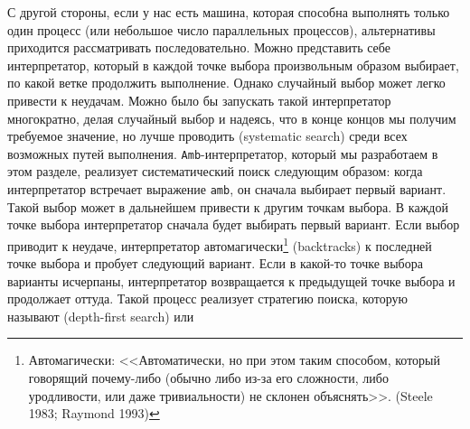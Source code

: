 С другой 
стороны, если у нас есть машина, которая способна
выполнять только один процесс (или небольшое число параллельных процессов),
альтернативы приходится рассматривать последовательно.  Можно
представить себе интерпретатор, который в каждой точке выбора
произвольным образом выбирает, по какой ветке продолжить выполнение.
Однако случайный выбор может легко привести к неудачам.
Можно было бы запускать такой интерпретатор многократно, делая
случайный выбор и надеясь, что в конце концов мы получим требуемое
значение, но лучше проводить 
 (systematic search)
среди всех возможных путей выполнения. {\tt Amb}-интерпретатор,
который мы разработаем в этом разделе, реализует систематический поиск
следующим образом: когда интерпретатор встречает выражение
{\tt amb}, он сначала выбирает первый вариант.  Такой выбор
может в дальнейшем привести к другим точкам выбора.  В каждой точке выбора
интерпретатор сначала будет выбирать первый вариант.  Если выбор
приводит к неудаче, интерпретатор 
автомагически\footnote{Автомагически:
<<Автоматически, но при этом таким способом,
который говорящий почему-либо (обычно либо из-за его сложности, либо
уродливости, или даже тривиальности) не склонен объяснять>>.
(Steele 1983; Raymond 1993)}
 (backtracks) к последней точке выбора и
пробует следующий вариант.  Если в какой-то точке выбора варианты
исчерпаны, интерпретатор возвращается к предыдущей точке выбора и
продолжает оттуда.  Такой процесс реализует стратегию поиска, которую
называют
 (depth-first search) или
